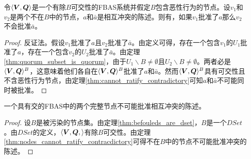 \begin{theorem}\label{thm:nodes_cannot_ratify_contracdictory}
        令$\langle{\bm V},{\bm Q}\rangle$是一个有除$B${\quorum}可交性的FBAS系统并假定$B$包含恶性行为的节点。设$v_1$和$v_2$是两个不在$B$中的节点，$a$和$\bar a$是相互冲突的陈述。则有，如果$v_1$批准了$a$那么$v_2$不会批准$\bar a$。
\end{theorem}

\begin{proof}
        反证法。假设$v_1$批准了$a$且$v_2$批准了$\bar a$。由定义可得，存在一个包含$v_1$的{\quorum}$U_1$批准了$a$，存在一个包含$v_2$的{\quorum}$U_2$批准了$\bar a$。由定理\ref{thm:quorum_subset_is_quorum}，由于$U_1\backslash B\neq \emptyset$且$U_2\backslash B\neq \emptyset$。两者必是$\langle{\bm V},{\bm Q}\rangle^{B}$，这意味着他们各自在$\langle{\bm V},{\bm Q}\rangle^{B}$批准了$a$和$\bar a$。然而$\langle{\bm V},{\bm Q}\rangle^{B}$具有{\quorum}可交性且不含恶性行为节点，由定理\ref{thm:cannot_ratify_contradictory}可知$a$和$\bar a$不可能同时被批准。
\end{proof}

\begin{theorem}\label{thm:intact_cannot_ratify_contracdictory}
        一个具有{\quorum}交的FBAS中的两个完整节点不可能批准相互冲突的陈述。
\end{theorem}

\begin{proof}
        设$B$是被污染的节点集。由定理\ref{thm:befouleds_are_dset}，$B$是一个$DSet$。由$DSet$的定义，$\langle{\bm V},{\bm Q},\rangle$有除$B${\quorum}可交性。由定理\ref{thm:nodes_cannot_ratify_contracdictory}可得不在$B$中的节点不可能批准冲突的陈述。
\end{proof}
